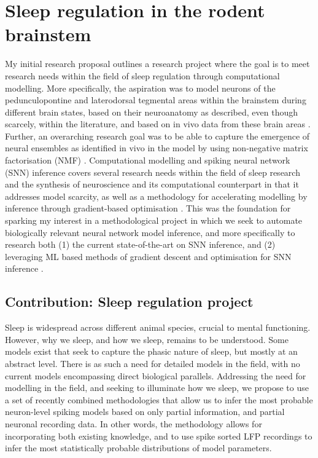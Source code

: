 \documentclass[mphil,deptreport,ai]{infthesis} %
\begin{document}
\chapter{Sleep regulation in the rodent brainstem}

My initial research proposal outlines a research project where the goal is to meet research needs within the field of sleep regulation through computational modelling.
More specifically, the aspiration was to model neurons of the pedunculopontine and laterodorsal tegmental areas within the brainstem during different brain states, based on their neuroanatomy as described, even though scarcely, within the literature, and based on in vivo data from these brain areas \cite{Herice2019c, Tsunematsu2019, Pal2007, Martinez-Gonzalez2011, Fraigne2015}.
Further, an overarching research goal was to be able to capture the emergence of neural ensembles as identified in vivo in the model by using non-negative matrix factorisation (NMF) \cite{Seung1999, Seung2001, Onken2016a}.
Computational modelling and spiking neural network (SNN) inference covers several research needs within the field of sleep research and the synthesis of neuroscience and its computational counterpart in that it addresses model scarcity, as well as a methodology for accelerating modelling by inference through gradient-based optimisation \cite{Herice2019c, Huh2017, Taherkhani2020}.
This was the foundation for sparking my interest in a methodological project in which we seek to automate biologically relevant neural network model inference, and more specifically to research both (1) the current state-of-the-art on SNN inference, and (2) leveraging ML based methods of gradient descent and optimisation for SNN inference \cite{Huh2017, Mostafa2020, Tavanaei2019b, Lee2016}.

\section{Contribution: Sleep regulation project}

Sleep is widespread across different animal species, crucial to mental functioning. However, why we sleep, and how we sleep, remains to be understood. Some models exist that seek to capture the phasic nature of sleep, but mostly at an abstract level. There is as such a need for detailed models in the field, with no current models encompassing direct biological parallels. Addressing the need for modelling in the field, and seeking to illuminate how we sleep, we propose to use a set of recently combined methodologies that allow us to infer the most probable neuron-level spiking models based on only partial information, and partial neuronal recording data. In other words, the methodology allows for incorporating both existing knowledge, and to use spike sorted LFP recordings to infer the most statistically probable distributions of model parameters.
\end{document}
